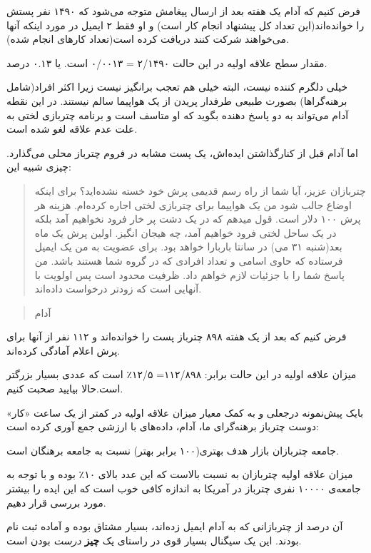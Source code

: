 فرض کنیم که آدام یک هفته بعد از ارسال پیغامش متوجه می‌شود که ۱۴۹۰ نفر
پستش را خوانده‌اند(این تعداد کل پیشنهاد‌ انجام کار است) و او فقط ۲ ایمیل
در مورد اینکه آنها می‌خواهند شرکت کنند دریافت کرده است(تعداد کارهای
انجام شده).

مقدار سطح علاقه اولیه در این حالت ۲/۱۴۹۰ = ۰/۰۰۱۳ است. یا ۰.۱۳ درصد.

خیلی دلگرم کننده نیست، البته خیلی هم تعجب برانگیز نیست زیرا اکثر
افراد(شامل برهنه‌گراها) بصورت طبیعی طرفدار پریدن از یک هواپیما سالم
نیستند. در این نقطه آدام می‌تواند به دو پاسخ دهنده بگوید که او متاسف است
و برنامه چتربازی لختی به علت عدم علاقه لغو شده است.

اما آدام قبل از کنارگذاشتن ایده‌اش، یک پست مشابه در فروم چترباز محلی
می‌گذارد. چیزی شبیه این:

\begin{quote}
چتربازان عزیز، آیا شما از راه رسم قدیمی پرش خود خسته نشده‌اید؟ برای
اینکه اوضاع جالب شود من یک هواپیما برای چتربازی لختی اجاره کرده‌ام.
هزینه هر پرش ۱۰۰ دلار است. قول میدهم که در یک دشت پر خار فرود نخواهیم
آمد بلکه در یک ساحل لختی فرود خواهیم آمد، چه هیجان انگیز. اولین پرش یک
ماه بعد(شنبه ۳۱ می) در سانتا باربارا خواهد بود. برای عضویت به من یک
ایمیل فرستاده که حاوی اسامی و تعداد افرادی که در گروه شما هستند باشد. من
پاسخ شما را با جزئیات لازم خواهم داد. ظرفیت محدود است پس اولویت با
آنهایی است که زودتر درخواست داده‌اند.
\end{quote}

\begin{quote}
آدام
\end{quote}

فرض کنیم که بعد از یک هفته ۸۹۸ چترباز پست را خوانده‌اند و ۱۱۲ نفر از
آنها برای پرش اعلام آمادگی کرده‌اند.

میزان علاقه اولیه در این حالت برابر: ۱۱۲/۸۹۸= ۱۲/۵٪ است که عددی بسیار
بزرگتر است.حالا بیایید صحبت کنیم.

بایک پیش‌نمونه درجعلی و به کمک معیار میزان علاقه اولیه در کمتر از یک
ساعت «کار» دوست چترباز برهنه‌گرای ما، آدام، داده‌های با ارزشی جمع آوری
کرده است:

جامعه چتربازان بازار هدف بهتری(۱۰۰ برابر بهتر) نسبت به جامعه برهنگان
است.

میزان علاقه اولیه چتربازان به نسبت بالاست که این عدد بالای ۱۰٪ بوده و با
توجه به جامعه‌ی ۱۰۰۰۰ نفری چترباز در آمریکا به اندازه کافی خوب است که
این ایده را بیشتر مورد بررسی قرار دهیم.

آن درصد از چتربازانی که به آدام ایمیل زده‌اند، بسیار مشتاق بوده و آماده
ثبت نام بودند. این یک سیگنال بسیار قوی در راستای یک \textbf{چیز}
\emph{درست} بودن است.

